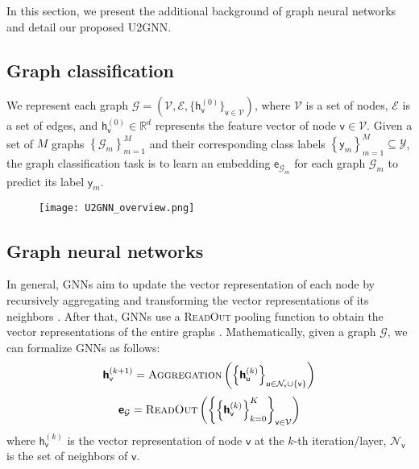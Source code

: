 \documentclass[twoside,leqno,twocolumn]{article}
\newcommand{\citep}{\cite}
\begin{document}
In this section, we present the additional background of graph neural networks and detail our proposed U2GNN.


\subsection{Graph classification} We represent each graph $\mathcal{G} = \left(\mathcal{V}, \mathcal{E}, \{\boldsymbol{\mathsf{h}}_{\mathsf{v}}^{(0)}\}_{\mathsf{v} \in \mathcal{V}}\right)$, where $\mathcal{V}$ is a set of nodes, $\mathcal{E}$ is a set of edges, and $\boldsymbol{\mathsf{h}}_{\mathsf{v}}^{(0)} \in \mathbb{R}^d$ represents the feature vector of node $\mathsf{v} \in \mathcal{V}$. 
Given a set of $M$ graphs $\left\{\mathcal{G}_m\right\}_{m=1}^M$ and their corresponding class labels $\left\{\mathsf{y}_m\right\}_{m=1}^M \subseteq \mathcal{Y}$, the graph classification task is to learn an embedding $\boldsymbol{\mathsf{e}}_{\mathcal{G}_m}$ for each graph $\mathcal{G}_m$ to predict its label $\mathsf{y}_m$.



\begin{figure*}[!ht]
\centering
\texttt{[image: U2GNN\_overview.png]}
\label{fig:U2GNN}
\end{figure*}


\subsection{Graph neural networks} 
In general, GNNs aim to update the vector representation of each node by recursively aggregating and transforming the vector representations of its neighbors \citep{kipf2017semi,hamilton2017inductive,velickovic2018graph}. 
After that, GNNs use a \textsc{ReadOut} pooling function to obtain the vector representations of the entire graphs \citep{Gilmer2017,zhang2018end,Ying2018diffpool,verma2018graph,xu2019powerful}.
Mathematically, given a graph $\mathcal{G}$, we can formalize GNNs as follows:
\begin{equation}
\boldsymbol{\mathsf{h}}_\mathsf{v}^{(k+1)} = \textsc{Aggregation}\left(\left\{\boldsymbol{\mathsf{h}}^{(k)}_\mathsf{u}\right\}_{\mathsf{u} \in \mathcal{N}_\mathsf{v}\cup\left\{\mathsf{v}\right\}}\right)
\end{equation}
\begin{equation}
\boldsymbol{\mathsf{e}}_{\mathcal{G}} = \textsc{ReadOut}\left(\left\{\left\{\boldsymbol{\mathsf{h}}_\mathsf{v}^{(k)}\right\}_{k=0}^K\right\}_{\mathsf{v} \in \mathcal{V}}\right)
\end{equation}
where $\boldsymbol{\mathsf{h}}_\mathsf{v}^{(k)}$ is the vector representation of node $\mathsf{v}$ at the $k$-th iteration/layer, $\mathcal{N}_\mathsf{v}$ is the set of neighbors of $\mathsf{v}$.
\end{document}
